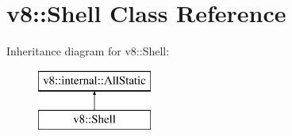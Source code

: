 \hypertarget{classv8_1_1_shell}{}\section{v8\+:\+:Shell Class Reference}
\label{classv8_1_1_shell}
Inheritance diagram for v8\+:\+:Shell\+:\begin{figure}[H]
\begin{center}
\leavevmode
\includegraphics[height=2.000000cm]{classv8_1_1_shell}
\end{center}
\end{figure}
